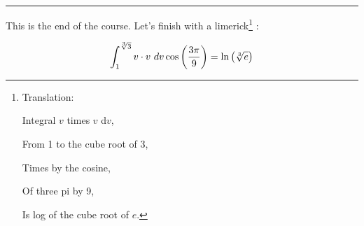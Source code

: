 \vspace{2cm}

\hrule

This is the end of the course. Let's finish with a limerick\footnote{Translation:\par
\hspace{3cm}Integral \(v\) times \(v\) d\(v\),\par
\hspace{3cm}From 1 to the cube root of 3,\par
\hspace{3cm}Times by the cosine,\par
\hspace{3cm}Of three pi by 9,\par
\hspace{3cm}Is log of the cube root of \(e\).}
:

\[\int_1^{\sqrt[3]{3}} v\cdot v \dx[v] \cos\left(\frac{3\pi}{9}\right) = \ln\left(\sqrt[3]{e}\right)\]
